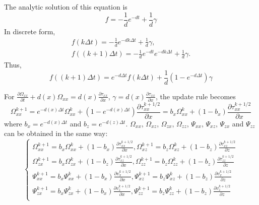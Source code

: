 The analytic solution of this equation is
\begin{equation}
f=-\frac{1}{d}e^{-d t}+\frac{1}{d}\gamma
\end{equation}
In discrete form,
\begin{equation}
\begin{split}
f(k\Delta t)=-\frac{1}{d}e^{-dk\Delta t}+\frac{1}{d}\gamma,\\
f((k+1)\Delta t)=-\frac{1}{d}e^{-d t}e^{-dk\Delta t}+\frac{1}{d}\gamma.
\end{split}
\end{equation}
Thus,
\begin{equation}
f((k+1)\Delta t)=e^{-d\Delta t}f(k\Delta t)+\frac{1}{d}(1-e^{-d\Delta t})\gamma
\end{equation}

For $\frac{\partial \Omega_{xx}}{\partial t}+d(x)\Omega_{xx}=d(x)\frac{\partial\tau_{xx}}{\partial x}$, $\gamma=d(x)\frac{\partial\tau_{xx}}{\partial x}$, the update rule becomes
\begin{equation}
\Omega_{xx}^{k+1}=e^{-d(x)\Delta t}\Omega_{xx}^{k}+(1-e^{-d(x)\Delta t})\frac{\partial\tau_{xx}^{k+1/2}}{\partial x}=b_x\Omega_{xx}^{k}+(1-b_x)\frac{\partial\tau_{xx}^{k+1/2}}{\partial x}
\end{equation}
where $b_x=e^{-d(x)\Delta t}$ and $b_z=e^{-d(z)\Delta t}$.
$\Omega_{xx}$, $\Omega_{xz}$, $\Omega_{zx}$, $\Omega_{zz}$, $\Psi_{xx}$, $\Psi_{xz}$, $\Psi_{zx}$ and $\Psi_{zz}$ can be obtained in the same way:
\begin{equation}\label{eq:auxiliary-elastic}
\left\{
\begin{split}
\Omega_{xx}^{k+1}=b_x\Omega_{xx}^{k}+(1-b_x)\frac{\partial\tau_{xx}^{k+1/2}}{\partial x},
\Omega_{xz}^{k+1}=b_z\Omega_{xz}^{k}+(1-b_z)\frac{\partial\tau_{xz}^{k+1/2}}{\partial z}\\
\Omega_{zx}^{k+1}=b_x\Omega_{zx}^{k}+(1-b_z)\frac{\partial\tau_{xz}^{k+1/2}}{\partial x},
\Omega_{zz}^{k+1}=b_z\Omega_{zz}^{k}+(1-b_z)\frac{\partial\tau_{zz}^{k+1/2}}{\partial z}\\
\Psi_{xx}^{k+1}=b_x\Psi_{xx}^{k}+(1-b_x)\frac{\partial v_x^{k+1/2}}{\partial x},
\Psi_{xz}^{k+1}=b_z\Psi_{xz}^{k}+(1-b_z)\frac{\partial v_x^{k+1/2}}{\partial z}\\
\Psi_{zx}^{k+1}=b_x\Psi_{zx}^{k}+(1-b_x)\frac{\partial v_z^{k+1/2}}{\partial x},
\Psi_{zz}^{k+1}=b_z\Psi_{zz}^{k}+(1-b_z)\frac{\partial v_z^{k+1/2}}{\partial z}\\
\end{split}
\right.
\end{equation}



